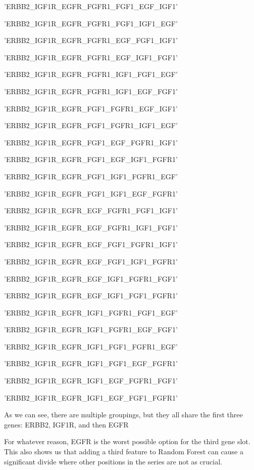 \documentclass[11pt]{article}
\begin{document}
    \begin{enumerate*}
\item 'ERBB2\_IGF1R\_EGFR\_FGFR1\_FGF1\_EGF\_IGF1'
\item 'ERBB2\_IGF1R\_EGFR\_FGFR1\_FGF1\_IGF1\_EGF'
\item 'ERBB2\_IGF1R\_EGFR\_FGFR1\_EGF\_FGF1\_IGF1'
\item 'ERBB2\_IGF1R\_EGFR\_FGFR1\_EGF\_IGF1\_FGF1'
\item 'ERBB2\_IGF1R\_EGFR\_FGFR1\_IGF1\_FGF1\_EGF'
\item 'ERBB2\_IGF1R\_EGFR\_FGFR1\_IGF1\_EGF\_FGF1'
\item 'ERBB2\_IGF1R\_EGFR\_FGF1\_FGFR1\_EGF\_IGF1'
\item 'ERBB2\_IGF1R\_EGFR\_FGF1\_FGFR1\_IGF1\_EGF'
\item 'ERBB2\_IGF1R\_EGFR\_FGF1\_EGF\_FGFR1\_IGF1'
\item 'ERBB2\_IGF1R\_EGFR\_FGF1\_EGF\_IGF1\_FGFR1'
\item 'ERBB2\_IGF1R\_EGFR\_FGF1\_IGF1\_FGFR1\_EGF'
\item 'ERBB2\_IGF1R\_EGFR\_FGF1\_IGF1\_EGF\_FGFR1'
\item 'ERBB2\_IGF1R\_EGFR\_EGF\_FGFR1\_FGF1\_IGF1'
\item 'ERBB2\_IGF1R\_EGFR\_EGF\_FGFR1\_IGF1\_FGF1'
\item 'ERBB2\_IGF1R\_EGFR\_EGF\_FGF1\_FGFR1\_IGF1'
\item 'ERBB2\_IGF1R\_EGFR\_EGF\_FGF1\_IGF1\_FGFR1'
\item 'ERBB2\_IGF1R\_EGFR\_EGF\_IGF1\_FGFR1\_FGF1'
\item 'ERBB2\_IGF1R\_EGFR\_EGF\_IGF1\_FGF1\_FGFR1'
\item 'ERBB2\_IGF1R\_EGFR\_IGF1\_FGFR1\_FGF1\_EGF'
\item 'ERBB2\_IGF1R\_EGFR\_IGF1\_FGFR1\_EGF\_FGF1'
\item 'ERBB2\_IGF1R\_EGFR\_IGF1\_FGF1\_FGFR1\_EGF'
\item 'ERBB2\_IGF1R\_EGFR\_IGF1\_FGF1\_EGF\_FGFR1'
\item 'ERBB2\_IGF1R\_EGFR\_IGF1\_EGF\_FGFR1\_FGF1'
\item 'ERBB2\_IGF1R\_EGFR\_IGF1\_EGF\_FGF1\_FGFR1'
\end{enumerate*}


    
    As we can see, there are multiple groupings, but they all share the
first three genes: ERBB2, IGF1R, and then EGFR

For whatever reason, EGFR is the worst possible option for the third
gene slot. This also shows us that adding a third feature to Random
Forest can cause a significant divide where other positions in the
series are not as crucial.
\end{document}
